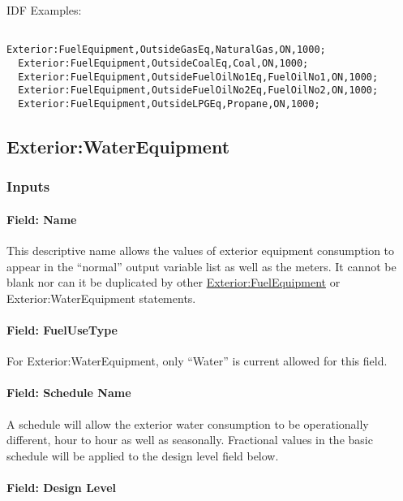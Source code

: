 IDF Examples:

\begin{lstlisting}

Exterior:FuelEquipment,OutsideGasEq,NaturalGas,ON,1000;
  Exterior:FuelEquipment,OutsideCoalEq,Coal,ON,1000;
  Exterior:FuelEquipment,OutsideFuelOilNo1Eq,FuelOilNo1,ON,1000;
  Exterior:FuelEquipment,OutsideFuelOilNo2Eq,FuelOilNo2,ON,1000;
  Exterior:FuelEquipment,OutsideLPGEq,Propane,ON,1000;
\end{lstlisting}

\subsection{Exterior:WaterEquipment}\label{exteriorwaterequipment}

\subsubsection{Inputs}\label{inputs-2-014}

\paragraph{Field: Name}\label{field-name-2-013}

This descriptive name allows the values of exterior equipment consumption to appear in the ``normal'' output variable list as well as the meters. It cannot be blank nor can it be duplicated by other \hyperref[exteriorfuelequipment]{Exterior:FuelEquipment} or Exterior:WaterEquipment statements.

\paragraph{Field: FuelUseType}\label{field-fuelusetype}

For Exterior:WaterEquipment, only ``Water'' is current allowed for this field.

\paragraph{Field: Schedule Name}\label{field-schedule-name-2-000}

A schedule will allow the exterior water consumption to be operationally different, hour to hour as well as seasonally. Fractional values in the basic schedule will be applied to the design level field below.

\paragraph{Field: Design Level}\label{field-design-level-2}


